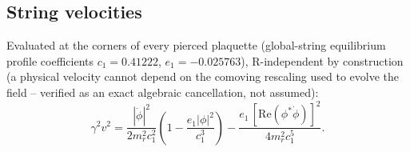 \documentclass[11pt]{article}
\begin{document}
\subsection{String velocities}
\label{sec:velocity}
Evaluated at the corners of every pierced plaquette (global-string equilibrium profile coefficients
$c_1=0.41222$, $e_1=-0.025763$), R-independent by construction (a physical velocity cannot depend on the
comoving rescaling used to evolve the field -- verified as an exact algebraic cancellation, not assumed):
\[
\gamma^2v^2 = \frac{|\dot\phi|^2}{2m_r^2c_1^2}\left(1-\frac{e_1|\phi|^2}{c_1^3}\right) -
\frac{e_1\,[\mathrm{Re}(\phi^*\dot\phi)]^2}{4m_r^2c_1^5}.
\]
\end{document}
